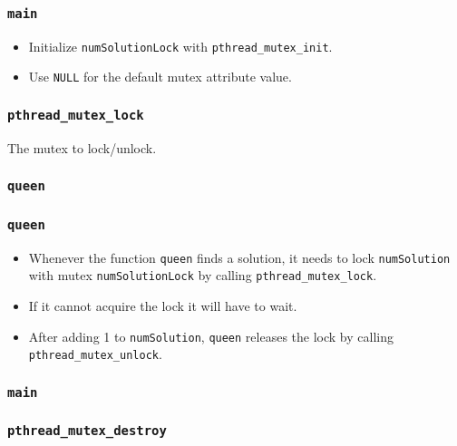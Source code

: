 \documentclass{beamer}
\begin{document}
\begin{frame}
\frametitle{\tt main}
\begin{itemize}
\item Initialize {\tt numSolutionLock} with {\tt pthread\_mutex\_init}.
\item Use {\tt NULL} for the default mutex attribute value.
\end{itemize}
\end{frame}

\begin{frame}
\frametitle{\tt pthread\_mutex\_lock}
\begin{description}[l]
\item[\tt mutex] The mutex to lock/unlock.
\end{description}
\end{frame}

\begin{frame}
\frametitle{\tt queen}
\end{frame}

\begin{frame}
\frametitle{\tt queen}
\begin{itemize}
\item Whenever the function {\tt queen} finds a solution, it needs to
  lock {\tt numSolution} with mutex {\tt numSolutionLock} by calling
  {\tt pthread\_mutex\_lock}.
\item If it cannot acquire the lock it will have to wait.
\item After adding 1 to {\tt numSolution}, {\tt queen} releases the
  lock by calling {\tt pthread\_mutex\_unlock}.
\end{itemize}
\end{frame}

\begin{frame}
\frametitle{\tt main}
\end{frame}

\begin{frame}
\frametitle{\tt pthread\_mutex\_destroy}
\end{frame}
\end{document}
